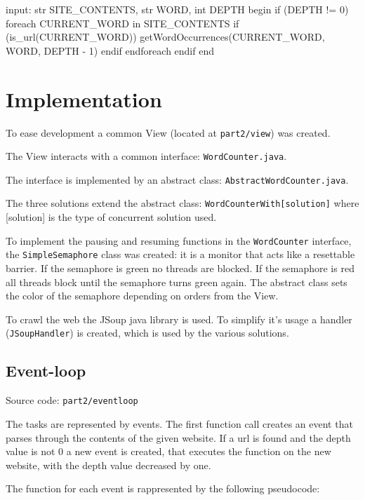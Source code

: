 \documentclass[12pt, a4paper]{report}
\begin{document}
\begin{algorithm}[caption={linkTask expressed in pseudocode}, label={alg2}]
input: str SITE_CONTENTS, str WORD, int DEPTH
begin
    if (DEPTH != 0)
        foreach CURRENT_WORD in SITE_CONTENTS
            if (is_url(CURRENT_WORD))
                getWordOccurrences(CURRENT_WORD, WORD, DEPTH - 1)
            endif
        endforeach
    endif
end       
\end{algorithm}

\section{Implementation}
To ease development a common View (located at \texttt{part2/view}) was created.

The View interacts with a common interface: \texttt{WordCounter.java}.
 
The interface is implemented by an abstract class: \texttt{AbstractWordCounter.java}. 

The three solutions extend the abstract class: \texttt{WordCounterWith[solution]} where [solution] is the type of concurrent solution used.

To implement the pausing and resuming functions in the
 \texttt{WordCounter} interface, the \texttt{SimpleSemaphore} class was created: it is a monitor that acts like a resettable barrier. If the
 semaphore is green no threads are blocked. If the semaphore is red all threads block until the semaphore turns green again. 
 The abstract class sets the color of the semaphore depending on orders from the View.

To crawl the web the JSoup java library is used. To simplify it's usage a handler (\texttt{JSoupHandler}) is created, which is used by the various solutions.

\subsection{Event-loop}
Source code: \texttt{part2/eventloop}

The tasks are represented by events. The first function call creates an event that parses through the contents of the given website.
 If a url is found and the depth value is not 0 a new event is created, that executes the function on the new website, with the depth value decreased by one.

 The function for each event is rappresented by the following pseudocode:

\newpage
\end{document}
